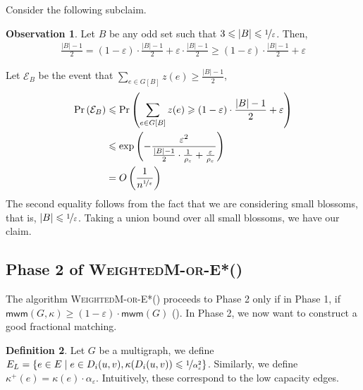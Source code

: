 \documentclass[a4paper,11pt]{article}
\DeclareMathOperator*{\Prob}{\ensuremath{\textnormal{Pr}}}
\renewcommand{\Pr}{\Prob}
\newcommand{\prob}[1]{\Pr\paren{#1}}
\newcommand{\card}[1]{|#1|}
\newcommand{\paren}[1]{\left ( #1 \right )}
\newcommand{\set}[1]{\ensuremath{\left\{ #1 \right\}}}
\newcommand{\eps}{\varepsilon}
\theoremstyle{definition}
\newtheorem{definition2}{Definition}
\theoremstyle{definition}
\theoremstyle{definition}
\theoremstyle{definition}
\theoremstyle{definition}
\theoremstyle{definition}
\theoremstyle{definition}
\newtheorem{observation2}[definition2]{Observation}
\theoremstyle{definition}
\theoremstyle{definition}
\theoremstyle{definition}
\theoremstyle{definition}
\theoremstyle{definition}
\theoremstyle{definition}
\theoremstyle{definition}
\theoremstyle{definition}
\begin{document}
Consider the following subclaim.
\begin{observation2}
    Let $B$ be any odd set such that $3\leqslant \card{B}\leqslant \nicefrac{1}{\eps}$. Then,
    \begin{align*}
    \frac{\card{B}-1}{2}=(1-\eps)\cdot \frac{\card{B}-1}{2}+\eps\cdot\frac{\card{B}-1}{2}\geqslant (1-\eps)\cdot \frac{\card{B}-1}{2} +\eps
    \end{align*}
\end{observation2}
Let $\mathcal{E}_{B}$ be the event that $\sum_{e\in G[B]}z(e)\geqslant \frac{\card{B}-1}{2}$,
\begin{align*}
\prob{\mathcal{E}_{B}}&\leqslant \prob{\sum_{e\in G[B]}z(e)\geqslant (1-\eps)\cdot \frac{\card{B}-1}{2}+\eps}\\
&\leqslant \exp\paren{-\frac{\eps^2}{\frac{\card{B}-1}{2}\cdot \frac{1}{\rho_{\eps}}+\frac{\eps}{\rho_{\eps}}}}\\
				  &=O\paren{\frac{1}{n^{{\nicefrac{1}{\eps}}}}}	
\end{align*}
The second equality follows from the fact that we are considering small blossoms, that is, $\card{B}\leqslant \nicefrac{1}{\eps}$. Taking a union bound over all small blossoms, we have our claim. 

\subsection{Phase 2 of \textsc{WeightedM-or-E*}()}

The algorithm \textsc{WeightedM-or-E*}() proceeds to Phase 2 only if in Phase 1, if $\textsf{mwm}(G,\kappa)\geqslant (1-\eps)\cdot \textsf{mwm}(G)$ (). In Phase 2, we now want to construct a good fractional matching. 

\begin{definition2}
Let $G$ be a multigraph, we define $E_{L}=\set{e\in E\mid e\in D_{i}(u,v), \kappa(D_{i}(u,v))\leqslant \nicefrac{1}{\alpha_{\eps}^2}}$. Similarly, we define $\kappa^+(e)=\kappa(e)\cdot \alpha_{\eps}$. Intuitively, these correspond to the low capacity edges. 
\end{definition2}
\end{document}
